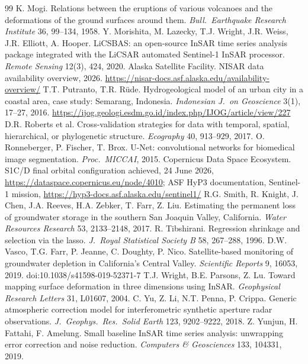 \begin{thebibliography}{99}
 K. Mogi. Relations between the eruptions of various volcanoes and the deformations of the ground surfaces around them. \emph{Bull.\ Earthquake Research Institute} 36, 99--134, 1958.
 Y. Morishita, M. Lazecky, T.J. Wright, J.R. Weiss, J.R. Elliott, A. Hooper. LiCSBAS: an open-source InSAR time series analysis package integrated with the LiCSAR automated Sentinel-1 InSAR processor. \emph{Remote Sensing} 12(3), 424, 2020.
 Alaska Satellite Facility. NISAR data availability overview, 2026. \url{https://nisar-docs.asf.alaska.edu/availability-overview/}
 T.T. Putranto, T.R. R\"ude. Hydrogeological model of an urban city in a coastal area, case study: Semarang, Indonesia. \emph{Indonesian J.\ on Geoscience} 3(1), 17--27, 2016. \url{https://ijog.geologi.esdm.go.id/index.php/IJOG/article/view/227}
 D.R. Roberts et al. Cross-validation strategies for data with temporal, spatial, hierarchical, or phylogenetic structure. \emph{Ecography} 40, 913--929, 2017.
 O. Ronneberger, P. Fischer, T. Brox. U-Net: convolutional networks for biomedical image segmentation. \emph{Proc.\ MICCAI}, 2015.
 Copernicus Data Space Ecosystem. S1C/D final orbital configuration achieved, 24 June 2026, \url{https://dataspace.copernicus.eu/node/4010}; ASF HyP3 documentation, Sentinel-1 mission, \url{https://hyp3-docs.asf.alaska.edu/sentinel1/}
 R.G. Smith, R. Knight, J. Chen, J.A. Reeves, H.A. Zebker, T. Farr, Z. Liu. Estimating the permanent loss of groundwater storage in the southern San Joaquin Valley, California. \emph{Water Resources Research} 53, 2133--2148, 2017.
 R. Tibshirani. Regression shrinkage and selection via the lasso. \emph{J.\ Royal Statistical Society B} 58, 267--288, 1996.
 D.W. Vasco, T.G. Farr, P. Jeanne, C. Doughty, P. Nico. Satellite-based monitoring of groundwater depletion in California's Central Valley. \emph{Scientific Reports} 9, 16053, 2019. doi:10.1038/s41598-019-52371-7
 T.J. Wright, B.E. Parsons, Z. Lu. Toward mapping surface deformation in three dimensions using InSAR. \emph{Geophysical Research Letters} 31, L01607, 2004.
 C. Yu, Z. Li, N.T. Penna, P. Crippa. Generic atmospheric correction model for interferometric synthetic aperture radar observations. \emph{J.\ Geophys.\ Res.\ Solid Earth} 123, 9202--9222, 2018.
 Z. Yunjun, H. Fattahi, F. Amelung. Small baseline InSAR time series analysis: unwrapping error correction and noise reduction. \emph{Computers \& Geosciences} 133, 104331, 2019.
\end{thebibliography}
